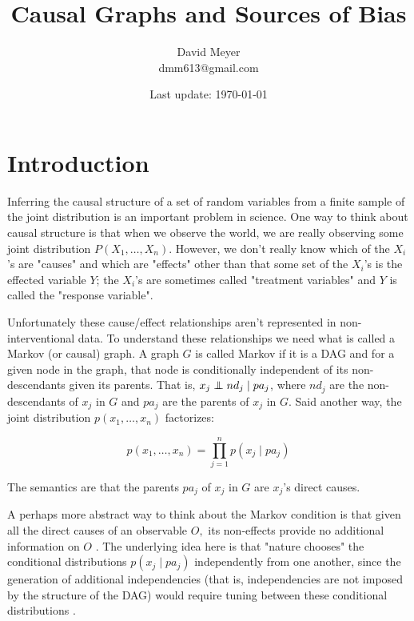 \documentclass[11pt, oneside]{article}   	%
\title{Causal Graphs and Sources of  Bias}
\author{David Meyer \\ dmm613@gmail.com}
\date{Last update: \today}							%
\newcommand\independent{\protect\mathpalette{\protect\independenT}{\perp}}
\def\independenT#1#2{\mathrel{\rlap{$#1#2$}\mkern2mu{#1#2}}}
\begin{document}
\maketitle


\section{Introduction} 
\label{sec:intro}
Inferring the causal structure of a set of random variables from a finite sample of the joint distribution is an important problem in science.
One way to think about causal structure is that when we observe the world, we are really observing some joint distribution
$P(X_1, \hdots, X_n)$. However, we don't really know which of the $X_i$'s are "causes" and which are "effects" other than that some set of the $X_i$'s is the effected variable $Y$;
the $X_i$'s are sometimes called "treatment variables" and $Y$ is called the "response variable". 

\bigskip
\noindent
Unfortunately these cause/effect relationships aren't represented in non-interventional data. To understand these relationships we need what is called
a Markov (or causal) graph. A graph $G$ is called Markov if it is a DAG and for a given node in the graph, that node is conditionally independent of its non-descendants 
given its parents. That is, $x_j \independent nd_j \mid  pa_j$, where $nd_j$ are the non-descendants of $x_j$ in $G$ 
and $pa_j$ are the parents of $x_j$ in $G$. Said another way,  the joint distribution $p(x_1,\hdots,x_n)$ factorizes: 

\begin{equation*}
p(x_1,\hdots,x_n) = \prod\limits_{j=1}^n p(x_j \mid pa_j) 
\end{equation*}

\bigskip
\noindent
The semantics are that the parents $pa_j$ of $x_j$ in $G$ are $x_j$'s direct causes.  


\bigskip
\noindent
A perhaps more abstract way to think about the Markov condition is that given all the direct causes of an observable $O,$ its non-effects provide 
no additional information on $O$ \cite{Peters:2014:CDC:2627435.2670315}.
The underlying idea here is that "nature chooses" the conditional distributions $p(x_j \mid pa_j)$ independently from one 
another, since the generation of additional independencies (that is, independencies are not imposed by the 
structure of the DAG) would require tuning between these conditional distributions \cite{Peters:2014:CDC:2627435.2670315}.
\end{document}
